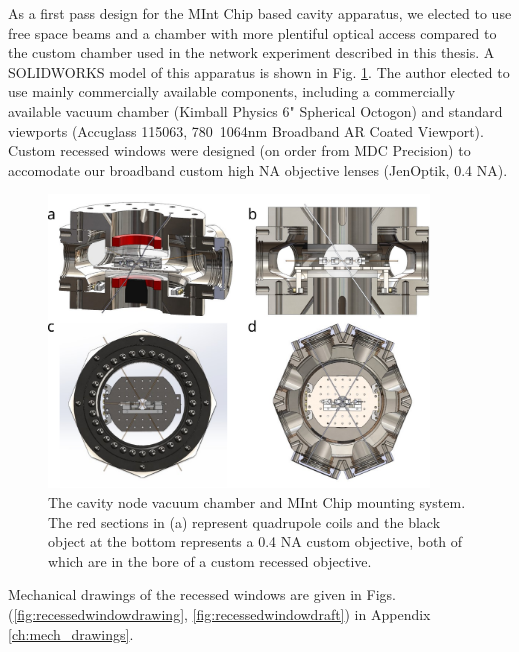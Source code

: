 As a first pass design for the MInt Chip based cavity apparatus, we elected to use free space beams and a chamber with more plentiful optical access compared to the custom chamber used in the network experiment described in this thesis. A SOLIDWORKS model of this apparatus is shown in Fig. \ref{fig:cavnodechamber}. The author elected to use mainly commercially available components, including a commercially available vacuum chamber (Kimball Physics 6" Spherical Octogon) and standard viewports (Accuglass 115063, 780~1064nm Broadband AR Coated Viewport). Custom recessed windows were designed (on order from MDC Precision) to accomodate our broadband custom high NA objective lenses (JenOptik, 0.4 NA).
\begin{figure}[htb]
    \centering
    \includegraphics[width=0.9\textwidth]{Images/mint_chip_science_chamber.pdf}
    \caption{The cavity node vacuum chamber and MInt Chip mounting system. The red sections in (a) represent quadrupole coils and the black object at the bottom represents a 0.4 NA  custom objective, both of which are in the bore of a custom recessed objective.}
    \label{fig:cavnodechamber}
\end{figure}
Mechanical drawings of the recessed windows are given in Figs. (\ref{fig:recessedwindowdrawing}, \ref{fig:recessedwindowdraft}) in Appendix \ref{ch:mech_drawings}.
    


